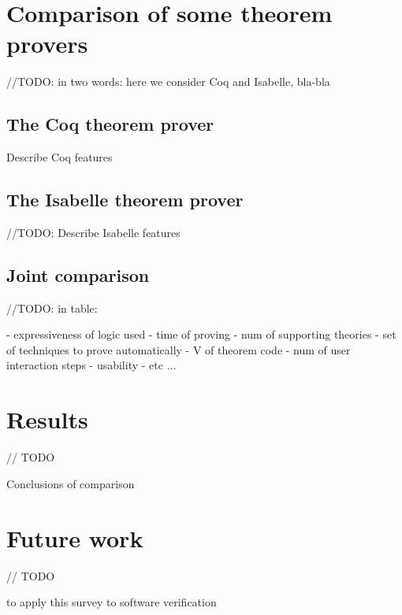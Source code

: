 \documentclass[article]{aaltoseries}
\begin{document}

\section{Comparison of some theorem provers}
\label{sec:comparison}

//TODO: in two words: here we consider Coq and Isabelle, bla-bla


\subsection{The Coq theorem prover}
\label{sec:prover_coq}

Describe Coq features


\subsection{The Isabelle theorem prover}
\label{sec:prover_isabelle}

//TODO: Describe Isabelle features


\subsection{Joint comparison}
\label{sec:joint_comparison}

//TODO: in table:

- expressiveness of logic used
- time of proving
- num of supporting theories
- set of techniques to prove automatically
- V of theorem code
- num of user interaction steps
- usability
- etc ...



\section{Results}
\label{sec:results}
// TODO

Conclusions of comparison


\section{Future work}
\label{sec:future_work}
// TODO

to apply this survey to software verification






\end{document}
